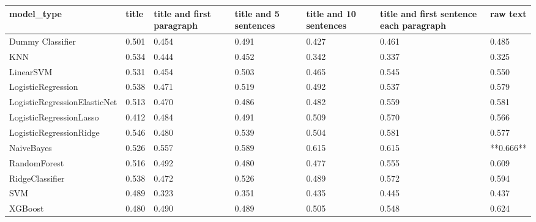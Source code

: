 \begin{tabular}{lllllll}
\toprule
                  model\_type & title & title and first paragraph & title and 5 sentences & title and 10 sentences & title and first sentence each paragraph &  raw text \\
\midrule
            Dummy Classifier & 0.501 &                     0.454 &                 0.491 &                  0.427 &                                   0.461 &     0.485 \\
                         KNN & 0.534 &                     0.444 &                 0.452 &                  0.342 &                                   0.337 &     0.325 \\
                   LinearSVM & 0.531 &                     0.454 &                 0.503 &                  0.465 &                                   0.545 &     0.550 \\
          LogisticRegression & 0.538 &                     0.471 &                 0.519 &                  0.492 &                                   0.537 &     0.579 \\
LogisticRegressionElasticNet & 0.513 &                     0.470 &                 0.486 &                  0.482 &                                   0.559 &     0.581 \\
     LogisticRegressionLasso & 0.412 &                     0.484 &                 0.491 &                  0.509 &                                   0.570 &     0.566 \\
     LogisticRegressionRidge & 0.546 &                     0.480 &                 0.539 &                  0.504 &                                   0.581 &     0.577 \\
                  NaiveBayes & 0.526 &                     0.557 &                 0.589 &                  0.615 &                                   0.615 & **0.666** \\
                RandomForest & 0.516 &                     0.492 &                 0.480 &                  0.477 &                                   0.555 &     0.609 \\
             RidgeClassifier & 0.538 &                     0.472 &                 0.526 &                  0.489 &                                   0.572 &     0.594 \\
                         SVM & 0.489 &                     0.323 &                 0.351 &                  0.435 &                                   0.445 &     0.437 \\
                     XGBoost & 0.480 &                     0.490 &                 0.489 &                  0.505 &                                   0.548 &     0.624 \\
\bottomrule
\end{tabular}
